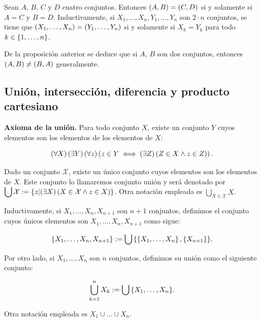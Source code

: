 \begin{proposition}
  \rm Sean $A$, $B$, $C$ y $D$ cuatro conjuntos. Entonces $\left(A,B\right)=\left(C,D\right)$ si y solamente si $A=C$ y $B=D$. Inductivamente, si $X_1,\dots,X_n,Y_1,\dots,Y_n$ son $2\cdot n$ conjuntos, se tiene que $\left(X_1,\dots,X_n\right)=\left(Y_1,\dots,Y_n\right)$ si y solamente si $X_k=Y_k$ para todo $k\in\left\{1,\dots,n\right\}$.
\end{proposition}

De la proposición anterior se deduce que si $A$, $B$ son dos conjuntos, entonces $\left(A,B\right)\neq\left(B,A\right)$ generalmente.

\subsection{Unión, intersección, diferencia y producto cartesiano}

\textbf{Axioma de la unión.} Para todo conjunto $X$, existe un conjunto $Y$ cuyos elementos son los elementos de los elementos de $X$:

\begin{equation}
  \left(\forall X\right)\left(\exists Y\right)\left(\forall z\right)\left(z\in Y\iff \left(\exists Z\right)\left(Z\in X\land z\in Z\right)\right).
\end{equation}

\begin{proposition}
  \rm Dado un conjunto $\mathcal{X}$, existe un único conjunto cuyos elementos son los elementos de $X$. Este conjunto lo llamaremos conjunto unión y será denotado por $\displaystyle\bigcup{\mathcal{X}}:=\left\{z\middle|\left(\exists X\right)\left(X\in\mathcal{X}\land z\in X\right)\right\}$. Otra notación empleada es $\displaystyle\bigcup_{X\in\mathcal{X}}{X}$.
\end{proposition}

Inductivamente, si $X_1,\dots,X_n,X_{n+1}$ son $n+1$ conjuntos, definimos el conjunto cuyos únicos elementos son $X_1,\dots,X_n,X_{n+1}$ como sigue:

\begin{equation}
  \left\{X_1,\dots,X_n,X_{n+1}\right\}:=\bigcup{\left\{\left\{X_1,\dots,X_n\right\},\left\{X_{n+1}\right\}\right\}}.
\end{equation}

Por otro lado, si $X_1,\dots,X_n$ son $n$ conjuntos, definimos su unión como el siguiente conjunto:

\begin{equation}
  \bigcup_{k=1}^{n}{X_k}:=\bigcup{\left\{X_1,\dots,X_n\right\}}.
\end{equation}

Otra notación empleada es $X_1\cup\dots\cup X_n$.

